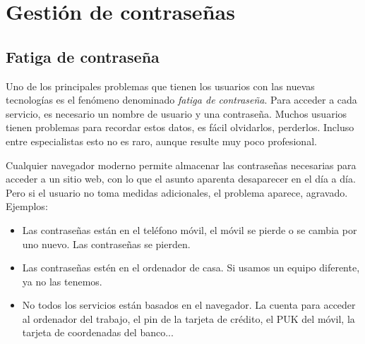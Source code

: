 \documentclass[a4paper,12pt]{article}
\begin{document}

\section{Gestión de contraseñas}
\subsection{Fatiga de contraseña}
Uno  de los principales problemas que tienen los usuarios con las nuevas tecnologías 
es el fenómeno denominado \emph{fatiga de contraseña}.
Para acceder a cada servicio, es necesario un nombre de usuario y una contraseña. Muchos usuarios
tienen problemas para recordar estos datos, es fácil olvidarlos, perderlos. Incluso entre especialistas
esto no es raro, aunque resulte muy poco profesional.


Cualquier navegador moderno permite almacenar las contraseñas necesarias para acceder a un sitio web, con lo que el asunto aparenta
desaparecer en el día a día. Pero si el usuario no toma medidas adicionales, el problema
aparece, agravado. Ejemplos:

\begin{itemize}
\item
Las contraseñas están en el teléfono móvil, el móvil se pierde o se cambia por uno nuevo. Las contraseñas
se pierden.

\item
Las contraseñas estén en el ordenador de casa. Si usamos un equipo diferente, ya no las tenemos.

\item
No todos los servicios están basados en el navegador. La cuenta para acceder al ordenador
del trabajo, el pin de la tarjeta de crédito, el PUK del móvil, la tarjeta de coordenadas del banco...

\end{itemize}
\end{document}
